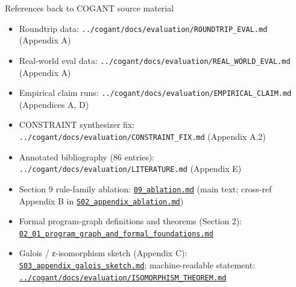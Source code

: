 \documentclass[
  ignorenonframetext,
]{beamer}
\author{\texorpdfstring{}{}}
\date{}
\providecommand{\tightlist}{%
  \setlength{\itemsep}{0pt}\setlength{\parskip}{0pt}}
\begin{document}
\begin{frame}[fragile]{References back to COGANT source material}
\protect{}\label{references-back-to-cogant-source-material}
\begin{itemize}
\tightlist
\item
  Roundtrip data: \texttt{../cogant/docs/evaluation/ROUNDTRIP\_EVAL.md}
  (Appendix A)
\item
  Real-world eval data:
  \texttt{../cogant/docs/evaluation/REAL\_WORLD\_EVAL.md} (Appendix A)
\item
  Empirical claim runs:
  \texttt{../cogant/docs/evaluation/EMPIRICAL\_CLAIM.md} (Appendices A,
  D)
\item
  CONSTRAINT synthesizer fix:
  \texttt{../cogant/docs/evaluation/CONSTRAINT\_FIX.md} (Appendix A.2)
\item
  Annotated bibliography (86 entries):
  \texttt{../cogant/docs/evaluation/LITERATURE.md} (Appendix E)
\item
  Section 9 rule-family ablation:
  \href{09_ablation.md}{\texttt{09\_ablation.md}} (main text; cross-ref
  Appendix B in
  \href{S02_appendix_ablation.md}{\texttt{S02\_appendix\_ablation.md}})
\item
  Formal program-graph definitions and theorems (Section 2):
  \href{02_01_program_graph_and_formal_foundations.md}{\texttt{02\_01\_program\_graph\_and\_formal\_foundations.md}}
\item
  Galois / ε-isomorphism sketch (Appendix C):
  \href{S03_appendix_galois_sketch.md}{\texttt{S03\_appendix\_galois\_sketch.md}};
  machine-readable statement:
  \href{../cogant/docs/evaluation/ISOMORPHISM_THEOREM.md}{\texttt{../cogant/docs/evaluation/ISOMORPHISM\_THEOREM.md}}
\end{itemize}
\end{frame}
\end{document}
